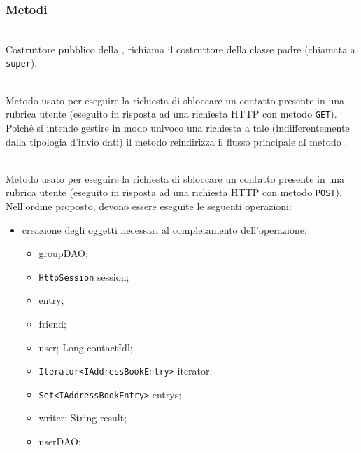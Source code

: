 \subsubsection*{Metodi}

\begin{description}
	\item{}\\
	Costruttore pubblico della , richiama il costruttore della classe padre (chiamata a \texttt{super}).
	
	\item{}\\
	Metodo usato per eseguire la richiesta di sbloccare un contatto presente in una rubrica utente (eseguito in risposta ad una richiesta HTTP con metodo \texttt{GET}). Poiché si intende gestire in modo univoco una richiesta a tale  (indifferentemente dalla tipologia d'invio dati) il metodo reindirizza il flusso principale al metodo .
	
	\item{}\\	
	Metodo usato per eseguire la richiesta di sbloccare un contatto presente in una rubrica utente (eseguito in risposta ad una richiesta HTTP con metodo \texttt{POST}). Nell'ordine proposto, devono essere eseguite le seguenti operazioni:
	\begin{itemize}
		\item creazione degli oggetti necessari al completamento dell'operazione:
		\begin{itemize}
			\item {} groupDAO;
			\item \texttt{HttpSession} session;
			\item {} entry;
			\item {} friend;
			\item {} user;
			Long contactIdl;
			\item \texttt{Iterator<IAddressBookEntry>} iterator;
			\item \texttt{Set<IAddressBookEntry>} entrys;
			\item {} writer;
			String result;
			\item {} userDAO;
		\end{itemize}
		

\end{itemize}
\end{description}
